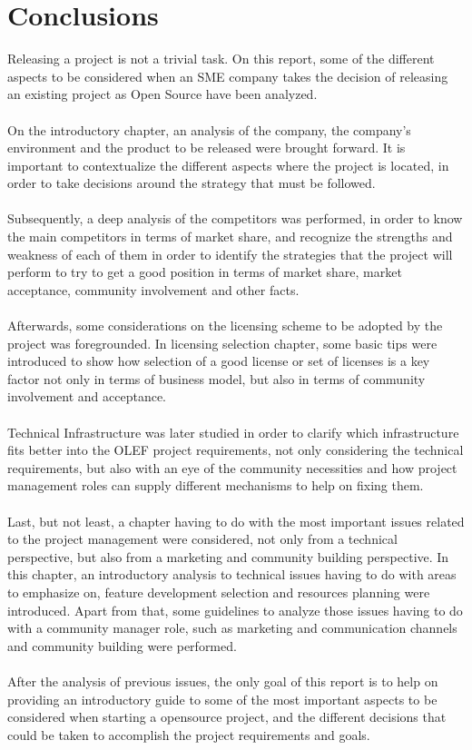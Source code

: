 \documentclass[11pt]{article}
\begin{document}
\section{Conclusions}
Releasing a project is not a trivial task. On this report, some of the different aspects to be considered when an SME company takes the decision of releasing an existing project as Open Source have been analyzed.\\
\\
On the introductory chapter, an analysis of the company, the company's environment and the product to be released were brought forward. It is important to contextualize the different aspects where the project is located, in order to take decisions around the strategy that must be followed.\\
\\
Subsequently, a deep analysis of the competitors was performed, in order to know the main competitors in terms of market share, and recognize the strengths and weakness of each of them in order to identify the strategies that the project will perform to try to get a good position in terms of market share, market acceptance, community involvement and other facts.\\
\\
Afterwards, some considerations on the licensing scheme to be adopted by the project was foregrounded. In licensing selection chapter, some basic tips were introduced to show how selection of a good license or set of licenses is a key factor not only in terms of business model, but also in terms of community involvement and acceptance.\\
\\
Technical Infrastructure was later studied in order to clarify which infrastructure fits better into the OLEF project requirements, not only considering the technical requirements, but also with an eye of the community necessities and how project management roles can supply different mechanisms to help on fixing them.\\
\\
Last, but not least, a chapter having to do with the most important issues related to the project management were considered, not only from a technical perspective, but also from a marketing and community building perspective. In this chapter, an introductory analysis to technical issues having to do with areas to emphasize on, feature development selection and resources planning were introduced. Apart from that, some guidelines to analyze those issues having to do with a community manager role, such as marketing and communication channels and community building were performed.\\
\\
After the analysis of previous issues, the only goal of this report is to help on providing an introductory guide to some of the most important aspects to be considered when starting a opensource project, and the different decisions that could be taken to accomplish the project requirements and goals.\\
\end{document}
